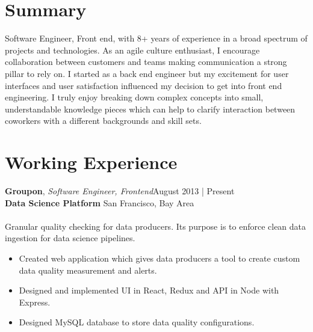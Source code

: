 \documentclass[line,letterpaper, 10pt]{res}
\begin{document}
\address{jorgepvenegas@gmail.com.com \ \ \textbullet \ \ \ San Francisco, CA \ \ \textbullet \ \ \ jorgepvenegas.com}
\begin{resume}
	
	\section{Summary}
	Software Engineer, Front end, with 8+ years of experience in a broad spectrum of projects and technologies. As an agile culture enthusiast, I encourage collaboration between customers and teams making communication a strong pillar to rely on. I started as a back end engineer but my excitement for user interfaces and user satisfaction influenced my decision to get into front end engineering. I truly enjoy breaking down complex concepts into small, understandable knowledge pieces which can help to clarify interaction between coworkers with a different backgrounds and skill sets.

	\section{Working Experience}
	\textbf{Groupon}, {\sl Software Engineer, Frontend}\hfill August 2013 | Present\\\textbf{Data Science Platform} \hfill San Francisco, Bay Area
	\\
	\\Granular quality checking for data producers. Its purpose is to enforce clean data ingestion for data science pipelines.\\

	\begin{itemize} \itemsep 3pt
	\item Created web application which gives data producers a tool to create custom data quality measurement and alerts.
	\item Designed and implemented UI in React, Redux and API in Node with Express.
	\item Designed MySQL database to store data quality configurations.
	\end{itemize}


\end{resume}
\end{document}
